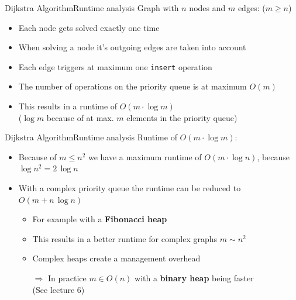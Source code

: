 \begin{frame}{Dijkstra Algorithm}{Runtime analysis}
  Graph with {\color{MainA}$n$} nodes and {\color{MainA}$m$}
  edges: ({\color{MainA}$m \geq n$})
  \begin{itemize}
    \item
      Each node gets solved exactly {\color{MainA}one time}
    \item
      When solving a node it's outgoing edges are taken into account
    \item
      Each edge triggers at maximum one \texttt{insert} operation
    \item
      The number of operations on the {\color{MainA}priority queue}
      is at maximum {\color{MainA}$O(m)$}
    \item
      This results in a runtime of
      {\color{MainA}$O(m \cdot \log m)$}\\
      {\color{gray}($\log m$ because of at max. $m$ elements in the priority
        queue)}
  \end{itemize}
\end{frame}


\begin{frame}{Dijkstra Algorithm}{Runtime analysis}
  Runtime of {\color{MainA}$O(m \cdot \log m)$}:
  \begin{itemize}
    \item
      Because of {\color{MainA}$m \leq n^2$} we have a maximum runtime of
      {\color{MainA}$O(m \cdot \log n)$}, because
      {\color{MainA}$\log n^2 = 2 \, \log n$}
    \item
      With a complex {\color{MainA}priority queue} the runtime can be
      reduced to {\color{MainA}$O(m + n \, \log n)$}
      \begin{itemize}
        \item
          For example with a \textbf{Fibonacci heap}
        \item
          This results in a better runtime for complex graphs
          {\color{MainA}$m \sim n^2$}
        \item
          Complex heaps create a management overhead
        \item[$\Rightarrow$]
          In practice {\color{MainA}$m \in O(n)$} with a
          \textbf{binary heap} being faster\\
          {\color{gray}(See lecture 6)}
      \end{itemize}
  \end{itemize}
\end{frame}

